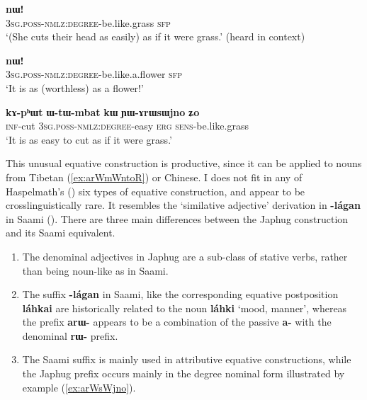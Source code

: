 \documentclass[oneside,a4paper,11pt]{article}
\newcommand{\ipa}[1]{{\phon\textbf{#1}}} %
\begin{document}
\begin{exe}
\ex \label{ex:arWsWjno}
\gll \ipa{ɯ-tɯ-ɤrɯsɯjno} 	\ipa{nɯ!}  \\
\textsc{3sg.poss-nmlz:degree}-be.like.grass \textsc{sfp} \\
\glt `(She cuts their head as easily) as if it were grass.' (heard in context)
\end{exe}

\begin{exe}
\ex \label{ex:arWmWntoR}
\gll \ipa{ɯ-tɯ-ɤrɯmɯntoʁ} 	\ipa{nɯ!}  \\
\textsc{3sg.poss-nmlz:degree}-be.like.a.flower \textsc{sfp} \\
\glt `It is as (worthless) as a flower!'
\end{exe}


\begin{exe}
\ex \label{ex:YArWsWjno}
\gll  
\ipa{kɤ-pʰɯt} 	\ipa{ɯ-tɯ-mbat} 	\ipa{kɯ} 	\ipa{ɲɯ-ɤrɯsɯjno} 	\ipa{ʑo} \\
\textsc{inf}-cut  \textsc{3sg.poss-nmlz:degree}-easy \textsc{erg} \textsc{sens}-be.like.grass \\
\glt `It is as easy to cut as if it were grass.' 
\end{exe}

This unusual equative construction is productive, since it can be applied to nouns from Tibetan (\ref{ex:arWmWntoR}) or Chinese. I does not fit in any of Haspelmath's (\citeyear{haspelmath17equative}) six types of equative construction, and appear to be crosslinguistically rare. It resembles the `similative adjective' derivation in \ipa{-lágan} in Saami (\citealt[5.1]{ylikovski17similarity}). There are three main differences between the Japhug construction and its Saami equivalent.

\begin{enumerate}
\item The denominal adjectives in Japhug are a sub-class of stative verbs, rather than being noun-like as in Saami.
\item The suffix \ipa{-lágan} in Saami, like the corresponding equative postposition \ipa{láhkai} are historically related to the noun \ipa{láhki} ‘mood, manner’, whereas the prefix \ipa{arɯ-} appears to be a combination of the passive \ipa{a-} with the denominal \ipa{rɯ-} prefix.
\item The Saami suffix is mainly used in attributive equative constructions, while the Japhug prefix occurs mainly in the degree nominal form illustrated by example (\ref{ex:arWsWjno}).
\end{enumerate}
\end{document}
